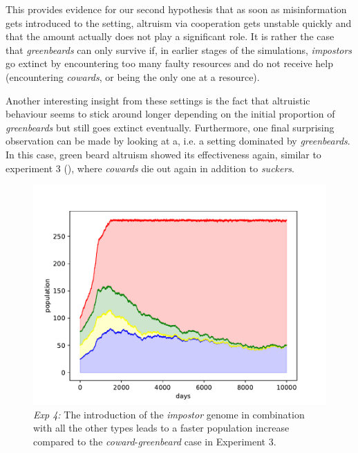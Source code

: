 \documentclass[sigconf]{acmart}
\newcommand{\cowards}{\textit{cowards}\xspace}
\newcommand{\coward}{\textit{coward}\xspace}
\newcommand{\suckers}{\textit{suckers}\xspace}
\newcommand{\impostors}{\textit{impostors}\xspace}
\newcommand{\impostor}{\textit{impostor}\xspace}
\newcommand{\greenbeards}{\textit{greenbeards}\xspace}
\newcommand{\greenbeard}{\textit{greenbeard}\xspace}
\begin{document}
    This provides evidence for our second hypothesis that as soon as misinformation gets introduced to the setting, altruism via cooperation gets unstable quickly and that the amount actually does not play a significant role.
    It is rather the case that \greenbeards can only survive if, in earlier stages of the simulations, \impostors go extinct by encountering too many faulty resources and do not receive help (encountering \cowards, or being the only one at a resource).

    Another interesting insight from these settings is the fact that altruistic behaviour seems to stick around longer depending on the initial proportion of \greenbeards but still goes extinct eventually.
    Furthermore, one final surprising observation can be made by looking at  a, i.e. a setting dominated by \greenbeards.
    In this case, green beard altruism showed its effectiveness again, similar to experiment 3 (), where \cowards die out again in addition to \suckers.

    \begin{figure}
        \includegraphics[width=\columnwidth]{figures/exp4_impostor}
        \caption{\textit{Exp 4:} The introduction of the \impostor genome in combination with all the other types leads to a faster population increase compared to the \coward-\greenbeard case in Experiment 3.}
        \label{fig:exp4_impostor}
    \end{figure}
\end{document}
